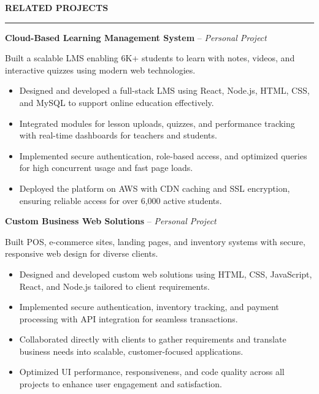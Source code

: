 \documentclass[10pt,letterpaper]{article}
\begin{document}
\vspace{6pt}

\textbf{RELATED PROJECTS}\\[-8pt]
\noindent\rule{\textwidth}{1pt}

\vspace{-2pt}

\textbf{Cloud-Based Learning Management System} -- \emph{Personal Project}

\vspace{-1pt}

Built a scalable LMS enabling 6K+ students to learn with notes, videos, and interactive quizzes using modern web technologies.
\vspace{-1pt}
\begin{itemize}
\item Designed and developed a full-stack LMS using React, Node.js, HTML, CSS, and MySQL to support online education effectively.
\item Integrated modules for lesson uploads, quizzes, and performance tracking with real-time dashboards for teachers and students.
\item Implemented secure authentication, role-based access, and optimized queries for high concurrent usage and fast page loads.
\item Deployed the platform on AWS with CDN caching and SSL encryption, ensuring reliable access for over 6,000 active students.
\end{itemize}

\textbf{Custom Business Web Solutions} -- \emph{Personal Project}

\vspace{-1pt}

Built POS, e-commerce sites, landing pages, and inventory systems with secure, responsive web design for diverse clients.
\vspace{-1pt}
\begin{itemize}
\item Designed and developed custom web solutions using HTML, CSS, JavaScript, React, and Node.js tailored to client requirements.
\item Implemented secure authentication, inventory tracking, and payment processing with API integration for seamless transactions.
\item Collaborated directly with clients to gather requirements and translate business needs into scalable, customer-focused applications.
\item Optimized UI performance, responsiveness, and code quality across all projects to enhance user engagement and satisfaction.
\end{itemize}
\end{document}
